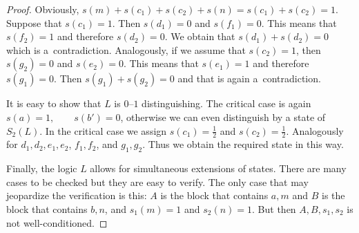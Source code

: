 \documentclass{article}
\begin{document}
{\begin{proof}
Obviously, $s(m)+s(c_1) + s(c_2)+s(n)=s(c_1) + s(c_2)=1$.
Suppose that $s(c_1)=1$. Then $s(d_1)=0$ and $s(f_1)=0$. This means that $s(f_2)=1$
and therefore $s(d_2)=0$. We obtain that
$s(d_1)+s(d_2)=0$ which is a~contradiction.
Analogously, if we assume that $s(c_2)=1$, then $s(g_2)=0$ and $s(e_2)=0$. This means that $s(e_1)=1$ and therefore $s(g_1)=0$. Then 
$s(g_1)+s(g_2)=0$ and that is again a~contradiction.

It is easy to show that $L$
is $0$--$1$ distinguishing. The critical
case is again $s(a)=1,\qquad s(b')=0$,
otherwise we can even distinguish by a state of $S_2(L)$.
In the critical case we assign
$s(c_1)=\frac12$ and $s(c_2)=\frac12$.
Analogously for $d_1, d_2, e_1, e_2$, $f_1,f_2$, and $g_1,g_2$. Thus we obtain the required state in this way. 

Finally, the logic $L$ allows for simultaneous extensions of states. There
are many cases to be checked but they
are easy to verify. The only case that may jeopardize the verification is this:
$A$ is the block that contains $a,m$ and $B$ is the block that contains $b,n$, and $s_1(m)=1$ and $s_2(n)=1$. But then $A, B, s_1,s_2$ is not well-conditioned.
\end{proof}

}
\end{document}
